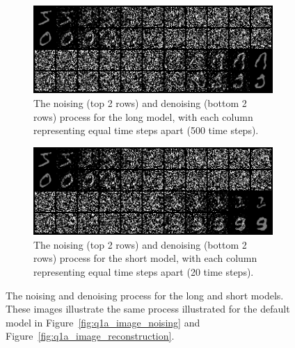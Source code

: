 \begin{figure}
\centering
\begin{subfigure}{0.8\textwidth}
    \centering
    \includegraphics[width=1\textwidth]{./figures/q1b_long_model_nd}
    \caption{The noising (top 2 rows) and denoising (bottom 2 rows) process for the long model, with each column
        representing equal time steps apart (500 time steps).}
    \label{fig:q1b_long_model_nd}
\end{subfigure}%
\hfill
\begin{subfigure}{0.8\textwidth}
    \centering
    \includegraphics[width=1\textwidth]{./figures/q1b_short_model_nd}
    \caption{The noising (top 2 rows) and denoising (bottom 2 rows) process for the short model, with each column
        representing equal time steps apart (20 time steps).}
    \label{fig:q1b_short_model_nd}
\end{subfigure}
\caption{The noising and denoising process for the long and short models.
    These images illustrate the same process illustrated for the default model in Figure~\eqref{fig:q1a_image_noising}
    and Figure~\eqref{fig:q1a_image_reconstruction}.}
\label{fig:q1b_short_long_model_nd}
\end{figure}

